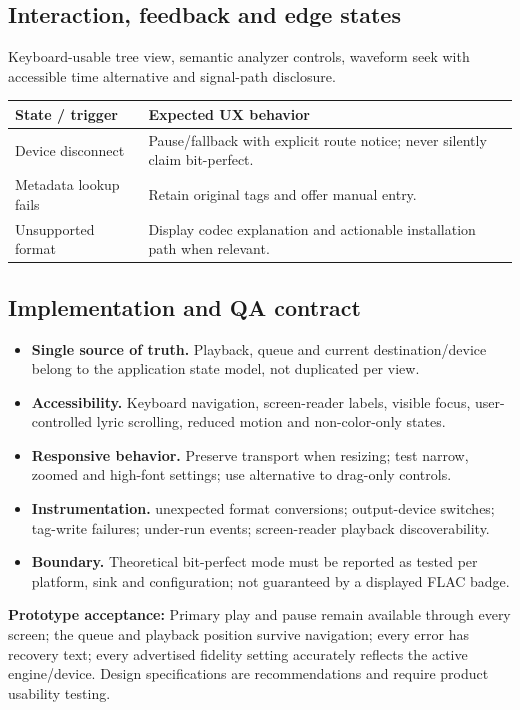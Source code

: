 \documentclass[10pt,a4paper,oneside]{report}
\begin{document}
\subsection*{Interaction, feedback and edge states}
Keyboard-usable tree view, semantic analyzer controls, waveform seek with accessible time alternative and signal-path disclosure.\par
\begin{tabularx}{\linewidth}{@{}p{39mm}X@{}}\toprule State / trigger & Expected UX behavior\\\midrule
Device disconnect & Pause/fallback with explicit route notice; never silently claim bit-perfect.\\
Metadata lookup fails & Retain original tags and offer manual entry.\\
Unsupported format & Display codec explanation and actionable installation path when relevant.\\
\bottomrule\end{tabularx}
\subsection*{Implementation and QA contract}
\begin{itemize}[leftmargin=*,itemsep=2pt,topsep=2pt]
\item \textbf{Single source of truth.} Playback, queue and current destination/device belong to the application state model, not duplicated per view.
\item \textbf{Accessibility.} Keyboard navigation, screen-reader labels, visible focus, user-controlled lyric scrolling, reduced motion and non-color-only states.
\item \textbf{Responsive behavior.} Preserve transport when resizing; test narrow, zoomed and high-font settings; use alternative to drag-only controls.
\item \textbf{Instrumentation.} unexpected format conversions; output-device switches; tag-write failures; under-run events; screen-reader playback discoverability.
\item \textbf{Boundary.} Theoretical bit-perfect mode must be reported as tested per platform, sink and configuration; not guaranteed by a displayed FLAC badge.
\end{itemize}
\vspace{2mm}\begin{evidencebox}\small\textbf{Prototype acceptance:} Primary play and pause remain available through every screen; the queue and playback position survive navigation; every error has recovery text; every advertised fidelity setting accurately reflects the active engine/device. Design specifications are recommendations and require product usability testing.\end{evidencebox}
\clearpage
\end{document}
